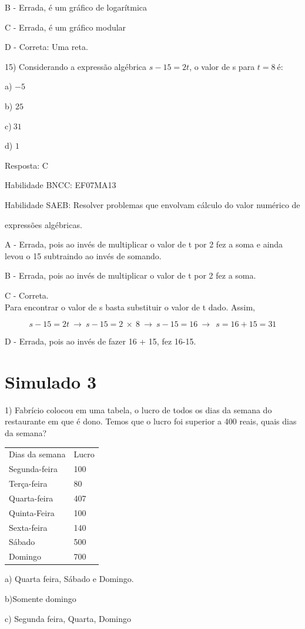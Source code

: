 B - Errada, é um gráfico de logarítmica

C - Errada, é um gráfico modular

D - Correta: Uma reta.

15) Considerando a expressão algébrica \(s - 15 = 2t\), o valor de s
para \(t = 8\ \)é:

a) \(- 5\)

b) \(25\)

c)\(\ 31\)

d) \(1\)

Resposta: C

Habilidade BNCC: EF07MA13

Habilidade SAEB: Resolver problemas que envolvam cálculo do valor
numérico de

expressões algébricas.

A - Errada, pois ao invés de multiplicar o valor de t por 2 fez a soma e
ainda levou o 15 subtraindo ao invés de somando.

B - Errada, pois ao invés de multiplicar o valor de t por 2 fez a soma.

C - Correta.\\
Para encontrar o valor de s basta substituir o valor de t dado. Assim,

\[s - 15 = 2t\  \rightarrow \ s - 15 = 2\  \times \ 8\  \rightarrow \ s - 15 = 16\  \rightarrow \ \ s = 16 + 15 = 31\]

D - Errada, pois ao invés de fazer 16 + 15, fez 16-15.

\section{Simulado 3}

1) Fabrício colocou em uma tabela, o lucro de todos os dias da semana do
restaurante em que é dono. Temos que o lucro foi superior a 400 reais,
quais dias da semana?

\begin{longtable}[]{@{}ll@{}}
\toprule
\endhead
Dias da semana & Lucro\tabularnewline
Segunda-feira & 100\tabularnewline
Terça-feira & 80\tabularnewline
Quarta-feira & 407\tabularnewline
Quinta-Feira & 100\tabularnewline
Sexta-feira & 140\tabularnewline
Sábado & 500\tabularnewline
Domingo & 700\tabularnewline
\bottomrule
\end{longtable}

a) Quarta feira, Sábado e Domingo.

b)Somente domingo

c) Segunda feira, Quarta, Domingo

